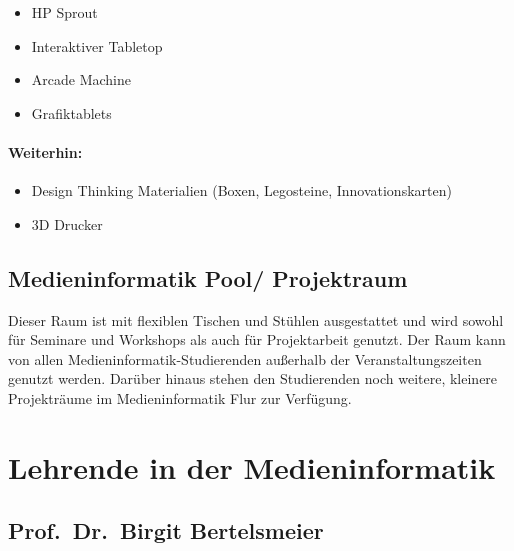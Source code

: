 \begin{itemize}
\tightlist
\item
  HP Sprout
\item
  Interaktiver Tabletop
\item
  Arcade Machine
\item
  Grafiktablets
\end{itemize}

\paragraph{Weiterhin:\label{/mi-2017/selbstbericht/0800-ausstattung/0000-ausstattung}}\label{weiterhinpathlabelmi-2017selbstbericht0800-ausstattung0000-ausstattung}

\begin{itemize}
\tightlist
\item
  Design Thinking Materialien (Boxen, Legosteine, Innovationskarten)
\item
  3D Drucker
\end{itemize}

\subsection{Medieninformatik Pool/
Projektraum\label{/mi-2017/selbstbericht/0800-ausstattung/0000-ausstattung}}\label{medieninformatik-pool-projektraumpathlabelmi-2017selbstbericht0800-ausstattung0000-ausstattung}

Dieser Raum ist mit flexiblen Tischen und Stühlen ausgestattet und wird
sowohl für Seminare und Workshops als auch für Projektarbeit genutzt.
Der Raum kann von allen Medieninformatik-Studierenden außerhalb der
Veranstaltungszeiten genutzt werden. Darüber hinaus stehen den
Studierenden noch weitere, kleinere Projekträume im Medieninformatik
Flur zur Verfügung.

\section{Lehrende in der
Medieninformatik\label{/mi-2017/selbstbericht/0800-ausstattung/0000-ausstattung}}\label{lehrende-in-der-medieninformatikpathlabelmi-2017selbstbericht0800-ausstattung0000-ausstattung}

\subsection{Prof.~Dr.~Birgit
Bertelsmeier\label{/mi-2017/selbstbericht/0800-ausstattung/0000-ausstattung}}\label{prof.dr.birgit-bertelsmeierpathlabelmi-2017selbstbericht0800-ausstattung0000-ausstattung}

